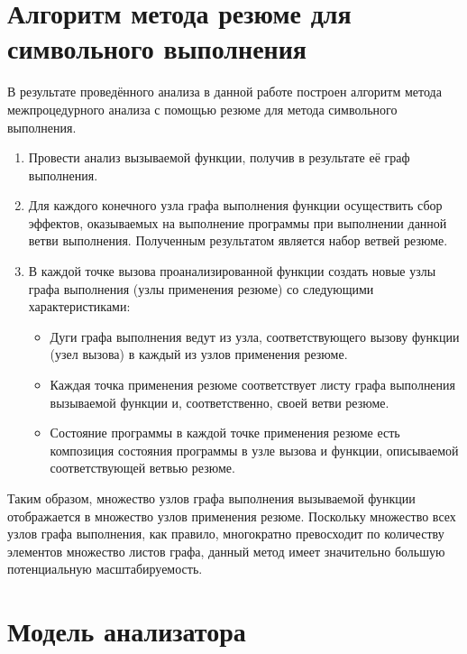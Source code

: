 \section{Алгоритм метода резюме для символьного выполнения}

В результате проведённого анализа в данной работе построен алгоритм метода межпроцедурного анализа с помощью резюме для метода символьного выполнения.

\begin{enumerate}
 \item Провести анализ вызываемой функции, получив в результате её граф выполнения.
 \item Для каждого конечного узла графа выполнения функции осуществить сбор эффектов, оказываемых на выполнение программы при выполнении данной ветви выполнения. Полученным результатом является набор ветвей резюме.
 \item В каждой точке вызова проанализированной функции создать новые узлы графа выполнения (узлы применения резюме) со следующими характеристиками:
 \begin{itemize}
  \item Дуги графа выполнения ведут из узла, соответствующего вызову функции (узел вызова) в каждый из узлов применения резюме.
  \item Каждая точка применения резюме соответствует листу графа выполнения вызываемой функции и, соответственно, своей ветви резюме.
  \item Состояние программы в каждой точке применения резюме есть композиция состояния программы в узле вызова и функции, описываемой соответствующей ветвью резюме.
 \end{itemize}
\end{enumerate}

Таким образом, множество узлов графа выполнения вызываемой функции отображается в множество узлов применения резюме. Поскольку множество всех узлов графа выполнения, как правило, многократно превосходит по количеству элементов множество листов графа, данный метод имеет значительно большую потенциальную масштабируемость.


\section{Модель анализатора} \label{sect2_1}

